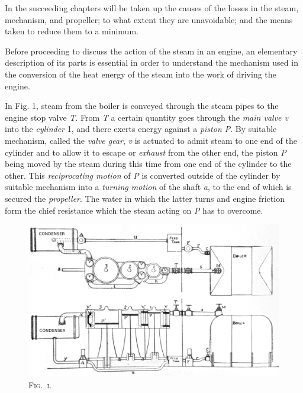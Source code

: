 \documentclass[11pt, a5paper]{book}
\begin{document}
In the succeeding chapters will be taken up the causes of the losses
in the steam, mechanism, and propeller; to what extent they are
unavoidable; and the means taken to reduce them to a minimum.\par

Before proceeding to discuss the action of the steam in an engine, an
elementary description of its parts is essential in order to
understand the mechanism used in the conversion of the heat energy of
the steam into the work of driving the engine.\par

In Fig. 1, steam from the boiler is conveyed through the steam pipes
to the engine stop valve \textit{T}.  From \textit{T} a certain
quantity goes through the \textit{main valve v} into the
\textit{cylinder} 1, and there exerts energy against a \textit{piston
 P}.  By suitable mechanism, called the \textit{valve gear},
\textit{v} is actuated to admit steam to one end of the cylinder and
to allow it to escape or \textit{exhaust} from the other end, the
piston \textit{P} being moved by the steam during this time from one
end of the cylinder to the other.  This \textit{reciprocating motion}
of \textit{P} is converted outside of the cylinder by suitable
mechanism into a \textit{turning motion} of the shaft \textit{a}, to
the end of which is secured the \textit{propeller}.  The water in
which the latter turns and engine friction form the chief resistance
which the steam acting on \textit{P} has to overcome.\par

\begin{figure}[ht]
  \centering
  \includegraphics[scale=0.5]{fig_1.jpg}
  \caption*{\textsc{Fig.\ i.}}
\end{figure}
\end{document}
